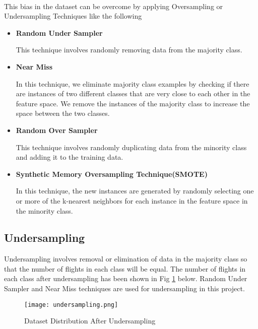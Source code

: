 \documentclass[12pt,letter-paper]{article}
\begin{document}
    \paragraph{}
        This bias in the dataset can be overcome by applying Oversampling or Undersampling Techniques like the following
        \begin{itemize}
        \item\textbf{Random Under Sampler}
            
            This technique involves randomly removing data from the majority class.
            
        \item\textbf{Near Miss}
            
            In this technique, we eliminate majority class examples by checking if there are instances of two different classes that are very close to each other in the feature space. We remove the instances of the majority class to increase the space between the two classes.  
            
        \item\textbf{Random Over Sampler}
            
            This technique involves randomly duplicating data from the minority class and adding it to the training data.
        
        \item\textbf{Synthetic Memory Oversampling Technique(SMOTE)}
            
            In this technique, the new instances are generated by randomly selecting one or more of the k-nearest neighbors for each instance in the feature space in the minority class.
        \end{itemize}
        
    \subsection{Undersampling}
    
    Undersampling involves removal or elimination of data in the majority class so that the number of flights in each class will be equal. The number of flights in each class after undersampling has been shown in Fig \ref{fig:2} below. Random Under Sampler and Near Miss techniques are used for undersampling in this project.
    
        \begin{figure}[H]%
            \begin{center}
                \texttt{[image: undersampling.png]}%
                    \caption{Dataset Distribution After Undersampling} 
                    \label{fig:2}
            \end{center}
        \end{figure}
        
\end{document}
